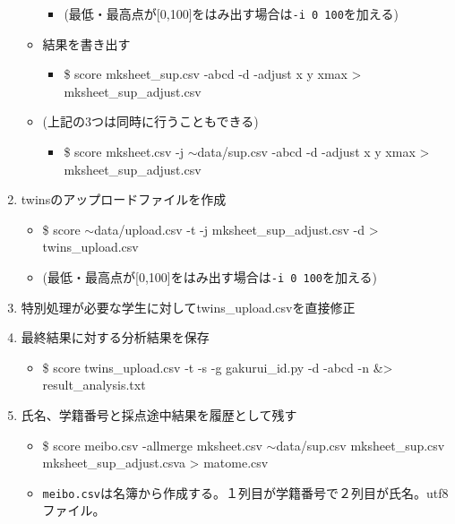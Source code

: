 \begin{enumerate}
\begin{itemize}
\begin{itemize}
\item (最低・最高点が{[0,100]}をはみ出す場合は\texttt{-i 0 100}を加える)

\end{itemize}

\item 結果を書き出す

\begin{itemize}
\item \$ score mksheet\_sup.csv -abcd -d -adjust x y xmax > mksheet\_sup\_adjust.csv

\end{itemize}

\item (上記の3つは同時に行うこともできる)

\begin{itemize}
\item \$ score mksheet.csv -j \ensuremath{\sim}data\slash sup.csv -abcd -d -adjust x y xmax > mksheet\_sup\_adjust.csv

\end{itemize}

\end{itemize}

\item twinsのアップロードファイルを作成

\begin{itemize}
\item \$ score \ensuremath{\sim}data\slash upload.csv -t -j mksheet\_sup\_adjust.csv -d > twins\_upload.csv

\item (最低・最高点が{[0,100]}をはみ出す場合は\texttt{-i 0 100}を加える)

\end{itemize}

\item 特別処理が必要な学生に対してtwins\_upload.csvを直接修正

\item 最終結果に対する分析結果を保存

\begin{itemize}
\item \$ score twins\_upload.csv -t -s -g gakurui\_id.py -d -abcd -n \&> result\_analysis.txt

\end{itemize}

\item 氏名、学籍番号と採点途中結果を履歴として残す

\begin{itemize}
\item \$ score meibo.csv -allmerge mksheet.csv \ensuremath{\sim}data\slash sup.csv mksheet\_sup.csv mksheet\_sup\_adjust.csva > matome.csv

\item \texttt{meibo.csv}は名簿から作成する。１列目が学籍番号で２列目が氏名。utf8ファイル。

\end{itemize}

\end{enumerate}

